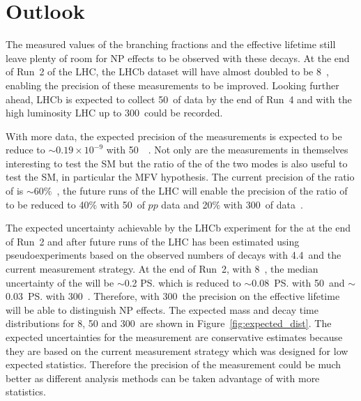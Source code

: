 \section{Outlook}
The measured values of the branching fractions and the effective lifetime still leave plenty of room for NP effects to be observed with these decays. At the end of Run~2 of the LHC, the LHCb dataset will have almost doubled to be 8~\fb, enabling the precision of these measurements to be improved. Looking further ahead, LHCb is expected to collect 50~\fb of data by the end of Run~4 and with the high luminosity LHC up to 300~\fb could be recorded. 

With more data, the expected precision of the \BF measurements is expected to be reduce to $\sim 0.19 \times 10^{-9}$ with 50~\fb~\cite{LHCb-PUB-2014-040}. Not only are the \BF measurements in themselves interesting to test the SM but the ratio of the \BFs of the two modes is also useful to test the SM, in particular the MFV hypothesis. The current precision of the ratio of \BFs is $\sim 60\%$~\cite{CMS:2014xfa}, the future runs of the LHC will enable the precision of the ratio of \BFs to be reduced to 40$\%$ with 50~\fb of $pp$ data and 20$\%$ with 300~\fb of data~\cite{Aaij:2244311}. 

The expected uncertainty achievable by the LHCb experiment for the \el at the end of Run~2 and after future runs of the LHC has been estimated using pseudoexperiments based on the observed numbers of decays with 4.4~\fb and the current measurement strategy. At the end of Run~2, with 8~\fb, the median uncertainty of the \el will be $\sim$0.2 \ps which is reduced to $\sim$0.08~\ps with 50~\fb and $\sim$0.03~\ps with 300~\fb. Therefore, with 300~\fb the precision on the effective lifetime will be able to distinguish NP effects. The expected mass and decay time distributions for 8, 50 and 300~\fb are shown in Figure~\ref{fig:expected_dist}. The expected uncertainties for the \el measurement are conservative estimates because they are based on the current measurement strategy which was designed for low expected statistics. Therefore the precision of the measurement could be much better as different analysis methods can be taken advantage of with more statistics. 


